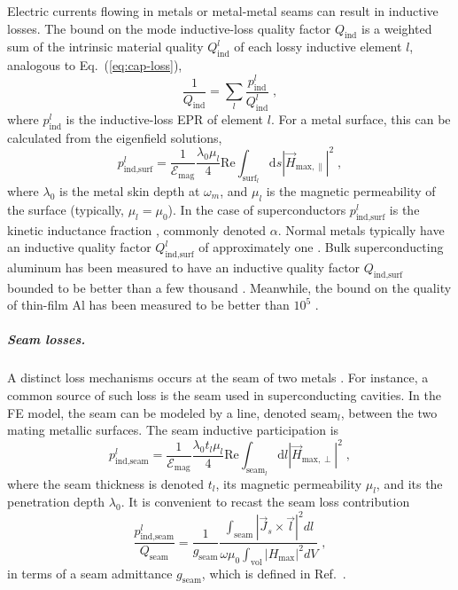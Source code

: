 Electric currents flowing in metals or metal-metal seams can result
in inductive losses. The bound on the mode inductive-loss quality
factor $Q_{\text{ind}}$ is a weighted sum of the intrinsic material
quality $Q_{\text{ind}}^{l}$ of each lossy inductive element $l$,
analogous to Eq.~(\ref{eq:cap-loss}), 
\begin{equation}
\frac{1}{Q_{\text{ind}}}=\sum_{l}{\frac{p_{\text{ind}}^{l}}{Q_{\text{ind}}^{l}}}\;,
\end{equation}
where $p_{\text{ind}}^{l}$ is the inductive-loss EPR of element $l$.
For a metal surface, this can be calculated from the eigenfield solutions,
\begin{equation}
p_{\text{ind,surf}}^{l}=\frac{1}{\mathcal{E}_{\mathrm{mag}}}\frac{\lambda_{0}\mu_{l}}{4}\mathrm{Re}\int_{\text{surf}_{l}}\mathrm{d}s\left|\vec{H}_{\text{max},\parallel}\right|^{2}\;,\label{eq:appx:dissip:p ind surf}
\end{equation}
where $\lambda_{0}$ is the metal skin depth at $\omega_{m}$, and
$\mu_{l}$ is the magnetic permeability of the surface (typically,
$\mu_{l}=\mu_{0}$). In the case of superconductors $p_{\text{ind,surf}}^{l}$
is the kinetic inductance fraction \citep{Gao2008,Zmuidzinas2012},
commonly denoted $\alpha$. Normal metals typically have an inductive
quality factor $Q_{\text{ind,surf}}^{l}$ of approximately one \citep{Pozar}.
Bulk superconducting aluminum has been measured to have an inductive
quality factor $Q_{\text{ind,surf}}$ bounded to be better than a
few thousand \citep{Reagor2013}. Meanwhile, the bound on the quality
of thin-film Al has been measured to be better than $10^{5}$ \citep{Minev2013}. 

\subparagraph{Seam losses. }

A distinct loss mechanisms occurs at the seam of two metals \citep{Brecht2015}.
For instance, a common source of such loss is the seam used in superconducting
cavities. In the FE model, the seam can be modeled by a line, denoted
$\text{seam}_{l}$, between the two mating metallic surfaces. The
seam inductive participation is 
\begin{equation}
p_{\text{ind,seam}}^{l}=\frac{1}{\mathcal{E}_{\mathrm{mag}}}\frac{\lambda_{0}t_{l}\mu_{l}}{4}\mathrm{Re}\int_{\text{seam}_{l}}\mathrm{d}l\left|\vec{H}_{\text{max},\perp}\right|^{2}\;,\label{eq:Pseam}
\end{equation}
where the seam thickness is denoted $t_{l}$, its magnetic permeability
$\mu_{l}$, and its the penetration depth $\lambda_{0}$. It is convenient
to recast the seam loss contribution 
\begin{equation}
\frac{p_{\text{ind,seam}}^{l}}{Q_{\text{seam}}}=\frac{1}{g_{\text{seam}}}\frac{\int_{\text{seam}}\left|\vec{J}_{s}\times\vec{l}\right|^{2}dl}{\omega\mu_{0}\int_{\text{vol}}\left|H_{\text{max}}\right|^{2}dV}\;,
\end{equation}
in terms of a seam admittance $g_{\text{seam}}$, which is defined
in Ref.~\citet{Brecht2015}.


